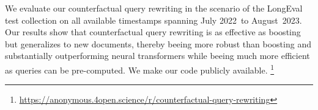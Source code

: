 We evaluate our counterfactual query rewriting in the scenario of the LongEval test collection on all available timestamps spanning July 2022~to August~2023. Our results show that counterfactual query rewriting is as effective as boosting but generalizes to new documents, thereby beeing more robust than boosting and substantially outperforming neural transformers while beeing much more efficient as queries can be pre-computed. We make our code publicly available.%
\footnote{\url{https://anonymous.4open.science/r/counterfactual-query-rewriting}}


